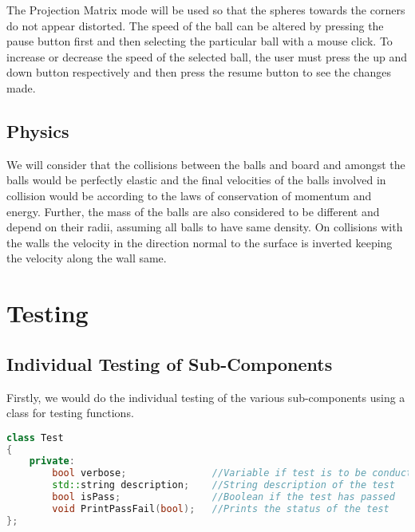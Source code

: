 \documentclass{article}
\begin{document}
\par\noindent The Projection Matrix mode will be used so that the spheres towards the corners do not appear distorted. The speed of the ball can be altered by pressing the pause button first and then selecting the particular ball with a mouse click. To increase or decrease the speed of the selected ball, the user must press the up and down button respectively and then press the resume button to see the changes made.

\subsection{Physics}
We will consider that the collisions between the balls and board and amongst the balls would be perfectly elastic and the final velocities of the balls involved in collision would be according to the laws of conservation of momentum and energy. Further, the mass of the balls are also considered to be different and depend on their radii, assuming all balls to have same density. On collisions with the walls the velocity in the direction normal to the surface is inverted keeping the velocity along the wall same.


\section{Testing}
\subsection{Individual Testing of Sub-Components}
Firstly, we would do the individual testing of the various sub-components using a class for testing functions.


\begin{lstlisting}[language=C++, caption={Class Parameters for Test}]
class Test
{
	private:
		bool verbose;               //Variable if test is to be conducted
		std::string description;    //String description of the test
		bool isPass;                //Boolean if the test has passed 
		void PrintPassFail(bool);   //Prints the status of the test
};
\end{lstlisting}
\end{document}
